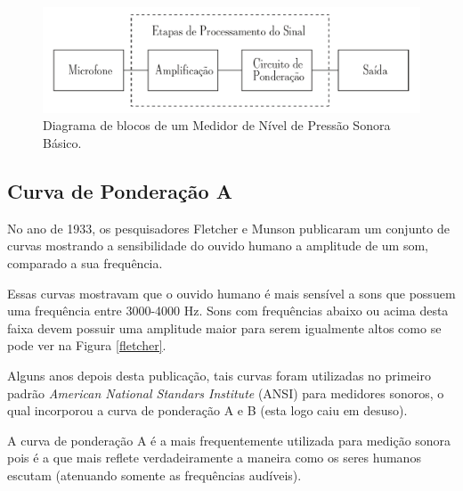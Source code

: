 \documentclass[
    12pt,               %
    openright,          %
    oneside,
    a4paper,            
    english,            %
    brazil              %
    ]{abntex2}
\begin{document}
\begin{figure}[!htb]
  \caption{\label{diag-blocos}Diagrama de blocos de um Medidor de Nível de Pressão Sonora Básico.}
  \begin{center}
  \includegraphics[scale=0.65]{images/etapas.pdf}
  \end{center}
\end{figure}

\subsection{Curva de Ponderação A}

No ano de 1933, os pesquisadores Fletcher e Munson publicaram um conjunto de curvas mostrando a sensibilidade do ouvido humano a amplitude de um som, comparado a sua frequência. 

Essas curvas mostravam que o ouvido humano é mais sensível a sons que possuem uma frequência entre 3000-4000 Hz. Sons com frequências abaixo ou acima desta faixa devem possuir uma amplitude maior para serem igualmente altos como se pode ver na Figura \ref{fletcher}.

Alguns anos depois desta publicação, tais curvas foram utilizadas no primeiro padrão \textit{American National Standars Institute} (ANSI) para medidores sonoros, o qual incorporou a curva de ponderação A e B (esta logo caiu em desuso).

A curva de ponderação A é a mais frequentemente utilizada para medição sonora pois é a que mais reflete verdadeiramente a maneira como os seres humanos escutam (atenuando somente as frequências audíveis).
\end{document}
